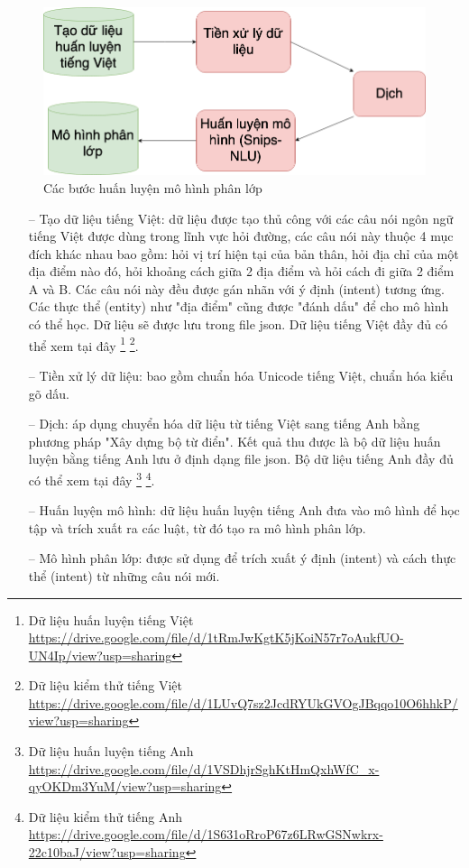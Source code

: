 \begin{figure}[H]
    \centering
    \includegraphics[width=15cm]{images/FlowTrainingData.png}
    \caption{Các bước huấn luyện mô hình phân lớp}
    \label{fig:FlowTrainingData}
\end{figure}

\begin{itemize}

    \item[--]Tạo dữ liệu tiếng Việt: dữ liệu được tạo thủ công với các câu nói ngôn ngữ tiếng Việt được dùng trong lĩnh vực hỏi đường, các câu nói này thuộc 4 mục đích khác nhau bao gồm: hỏi vị trí hiện tại của bản thân, hỏi địa chỉ của một địa điểm nào đó, hỏi khoảng cách giữa 2 địa điểm và hỏi cách đi giữa 2 điểm A và B. Các câu nói này đều được gán nhãn với ý định (intent) tương ứng. Các thực thể (entity) như "địa điểm" cũng được "đánh dấu" để cho mô hình có thể học. Dữ liệu sẽ được lưu trong file json. Dữ liệu tiếng Việt đầy đủ có thể xem tại đây \footnote{Dữ liệu huấn luyện tiếng Việt \url{https://drive.google.com/file/d/1tRmJwKgtK5jKoiN57r7oAukfUO-UN4Ip/view?usp=sharing}}
    \footnote{Dữ liệu kiểm thử tiếng Việt \url{https://drive.google.com/file/d/1LUvQ7sz2JcdRYUkGVOgJBqqo10O6hhkP/view?usp=sharing}}.

\item[--]Tiền xử lý dữ liệu: bao gồm chuẩn hóa Unicode tiếng Việt, chuẩn hóa kiểu gõ dấu.

\item[--]Dịch: áp dụng chuyển hóa dữ liệu từ tiếng Việt sang tiếng Anh bằng phương pháp "Xây dựng bộ từ điển". Kết quả thu được là bộ dữ liệu huấn luyện bằng tiếng Anh lưu ở định dạng file json. Bộ dữ liệu tiếng Anh đầy đủ có thể xem tại đây \footnote{Dữ liệu huấn luyện tiếng Anh \url{https://drive.google.com/file/d/1VSDhjrSghKtHmQxhWfC_x-qyOKDm3YuM/view?usp=sharing}}
    \footnote{Dữ liệu kiểm thử tiếng Anh \url{https://drive.google.com/file/d/1S631oRroP67z6LRwGSNwkrx-22c10baJ/view?usp=sharing}}.

\item[--]Huấn luyện mô hình: dữ liệu huấn luyện tiếng Anh đưa vào mô hình để học tập và trích xuất ra các luật, từ đó tạo ra mô hình phân lớp.
\item[--]Mô hình phân lớp: được sử dụng để trích xuất ý định (intent) và cách thực thể (intent) từ những câu nói mới.
\end{itemize}



